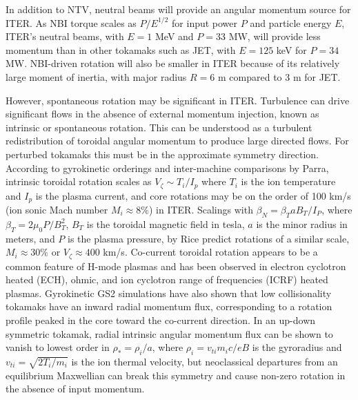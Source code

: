 \documentclass[aip, pop, preprint]{revtex4-1}
\numberwithin{figure}{section}
\numberwithin{equation}{section}
\begin{document}

In addition to NTV, neutral beams will provide an angular momentum source for ITER. As NBI torque scales as $P/E^{1/2}$ for input power $P$ and particle energy $E$, ITER's neutral beams, with $E = 1$ MeV and $P = 33$ MW, will provide less momentum than in other tokamaks such as JET, with $E = 125$ keV for $P = 34$ MW.\cite{Ciric2011} NBI-driven rotation will also be smaller in ITER because of its relatively large moment of inertia, with major radius $R = 6$ m compared to 3 m for JET. 

However, spontaneous rotation may be significant in ITER. Turbulence can drive significant flows in the absence of external momentum injection, known as intrinsic or spontaneous rotation. This can be understood as a turbulent redistribution of toroidal angular momentum to produce large directed flows. For perturbed tokamaks this must be in the approximate symmetry direction. According to gyrokinetic orderings and inter-machine comparisons by Parra,\cite{Parra2012} intrinsic toroidal rotation scales as $V_{\zeta} \sim  T_i/I_p$ where $T_i$ is the ion temperature and $I_p$ is the plasma current, and core rotations may be on the order of 100 km/s (ion sonic Mach number $M_i \approx 8\%$) in ITER. Scalings with $\beta_N = \beta_T a B_T/I_P$, where $\beta_T =  2\mu_0 P/B_T^2$, $B_T$ is the toroidal magnetic field in tesla, $a$ is the minor radius in meters, and $P$ is the plasma pressure, by Rice\cite{Rice2007} predict rotations of a similar scale, $M_i \approx 30\%$ or $V_{\zeta} \approx 400$ km/s. Co-current toroidal rotation appears to be a common feature of H-mode plasmas and has been observed in electron cyclotron heated (ECH),\cite{DeGrassie2007} ohmic,\cite{DeGrassie2007} and ion cyclotron range of frequencies (ICRF) \cite{Noterdaeme2003} heated plasmas. Gyrokinetic GS2 simulations have also shown that low collisionality tokamaks have an inward radial momentum flux, corresponding to a rotation profile peaked in the core toward the co-current direction.\cite{Barnes2013} In an up-down symmetric tokamak, radial intrinsic angular momentum flux can be shown to vanish to lowest order in $\rho_* = \rho_i/a$, where $\rho_i = v_{ti}m_i c/{eB}$ is the gyroradius and $v_{ti} = \sqrt{2T_i/m_i}$ is the ion thermal velocity, but neoclassical departures from an equilibrium Maxwellian can break this symmetry and cause non-zero rotation in the absence of input momentum.\cite{Barnes2013} 
\end{document}
